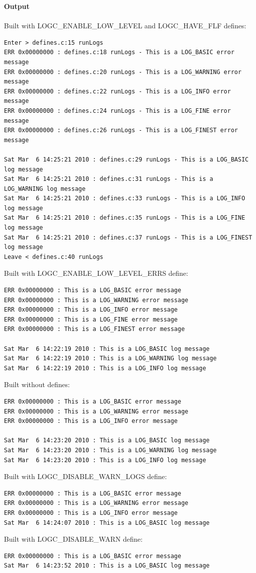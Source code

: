 \documentclass[a4paper, titlepage, 11pt]{article}
\begin{document}
\textbf{Output} \\ \\
Built with LOGC\_ENABLE\_LOW\_LEVEL and LOGC\_HAVE\_FLF defines:
\begin{verbatim}
Enter > defines.c:15 runLogs
ERR 0x00000000 : defines.c:18 runLogs - This is a LOG_BASIC error message
ERR 0x00000000 : defines.c:20 runLogs - This is a LOG_WARNING error message
ERR 0x00000000 : defines.c:22 runLogs - This is a LOG_INFO error message
ERR 0x00000000 : defines.c:24 runLogs - This is a LOG_FINE error message
ERR 0x00000000 : defines.c:26 runLogs - This is a LOG_FINEST error message

Sat Mar  6 14:25:21 2010 : defines.c:29 runLogs - This is a LOG_BASIC log message
Sat Mar  6 14:25:21 2010 : defines.c:31 runLogs - This is a LOG_WARNING log message
Sat Mar  6 14:25:21 2010 : defines.c:33 runLogs - This is a LOG_INFO log message
Sat Mar  6 14:25:21 2010 : defines.c:35 runLogs - This is a LOG_FINE log message
Sat Mar  6 14:25:21 2010 : defines.c:37 runLogs - This is a LOG_FINEST log message
Leave < defines.c:40 runLogs
\end{verbatim}
Built with LOGC\_ENABLE\_LOW\_LEVEL\_ERRS define:
\begin{verbatim}
ERR 0x00000000 : This is a LOG_BASIC error message
ERR 0x00000000 : This is a LOG_WARNING error message
ERR 0x00000000 : This is a LOG_INFO error message
ERR 0x00000000 : This is a LOG_FINE error message
ERR 0x00000000 : This is a LOG_FINEST error message

Sat Mar  6 14:22:19 2010 : This is a LOG_BASIC log message
Sat Mar  6 14:22:19 2010 : This is a LOG_WARNING log message
Sat Mar  6 14:22:19 2010 : This is a LOG_INFO log message

\end{verbatim}
Built without defines:
\begin{verbatim}
ERR 0x00000000 : This is a LOG_BASIC error message
ERR 0x00000000 : This is a LOG_WARNING error message
ERR 0x00000000 : This is a LOG_INFO error message

Sat Mar  6 14:23:20 2010 : This is a LOG_BASIC log message
Sat Mar  6 14:23:20 2010 : This is a LOG_WARNING log message
Sat Mar  6 14:23:20 2010 : This is a LOG_INFO log message

\end{verbatim}
Built with LOGC\_DISABLE\_WARN\_LOGS define:
\begin{verbatim}
ERR 0x00000000 : This is a LOG_BASIC error message
ERR 0x00000000 : This is a LOG_WARNING error message
ERR 0x00000000 : This is a LOG_INFO error message
Sat Mar  6 14:24:07 2010 : This is a LOG_BASIC log message

\end{verbatim}
Built with LOGC\_DISABLE\_WARN define:
\begin{verbatim}
ERR 0x00000000 : This is a LOG_BASIC error message
Sat Mar  6 14:23:52 2010 : This is a LOG_BASIC log message
\end{verbatim}
\end{document}
